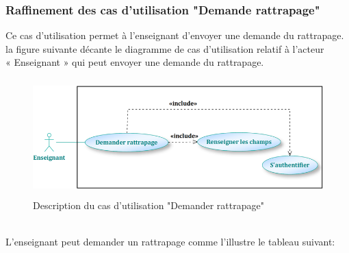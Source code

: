 \documentclass[12 pt ]{report}
\begin{document}
\subsubsection{Raffinement des cas d’utilisation "Demande rattrapage"}
Ce cas d'utilisation permet à l'enseignant d'envoyer une demande du rattrapage.\\
la figure suivante décante le diagramme de cas d’utilisation  relatif à l’acteur \\« Enseignant » qui peut envoyer une demande du rattrapage.
\begin{figure}[h]
\begin{center}
\includegraphics[width= 12cm , height = 4.5cm]{enseignant1.png}
\caption{Description du cas d'utilisation "Demander rattrapage"}
\end{center}
\end{figure}
\\
L'enseignant peut demander un rattrapage comme l’illustre le tableau suivant:
\end{document}
